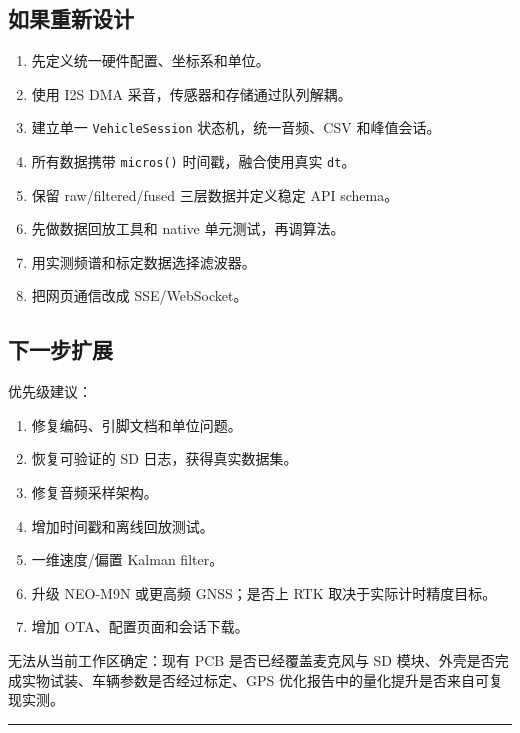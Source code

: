 \documentclass[
  UTF8,11pt,a4paper]{ctexart}
\newcommand{\passthrough}[1]{#1}
\providecommand{\tightlist}{%
  \setlength{\itemsep}{0pt}\setlength{\parskip}{0pt}}
\begin{document}
\subsection{如果重新设计}\label{ux5982ux679cux91cdux65b0ux8bbeux8ba1}

\begin{enumerate}
\def\labelenumi{\arabic{enumi}.}
\tightlist
\item
  先定义统一硬件配置、坐标系和单位。
\item
  使用 I2S DMA 采音，传感器和存储通过队列解耦。
\item
  建立单一 \passthrough{\lstinline!VehicleSession!}
  状态机，统一音频、CSV 和峰值会话。
\item
  所有数据携带 \passthrough{\lstinline!micros()!} 时间戳，融合使用真实
  \passthrough{\lstinline!dt!}。
\item
  保留 raw/filtered/fused 三层数据并定义稳定 API schema。
\item
  先做数据回放工具和 native 单元测试，再调算法。
\item
  用实测频谱和标定数据选择滤波器。
\item
  把网页通信改成 SSE/WebSocket。
\end{enumerate}

\subsection{下一步扩展}\label{ux4e0bux4e00ux6b65ux6269ux5c55}

优先级建议：

\begin{enumerate}
\def\labelenumi{\arabic{enumi}.}
\tightlist
\item
  修复编码、引脚文档和单位问题。
\item
  恢复可验证的 SD 日志，获得真实数据集。
\item
  修复音频采样架构。
\item
  增加时间戳和离线回放测试。
\item
  一维速度/偏置 Kalman filter。
\item
  升级 NEO-M9N 或更高频 GNSS；是否上 RTK 取决于实际计时精度目标。
\item
  增加 OTA、配置页面和会话下载。
\end{enumerate}

无法从当前工作区确定：现有 PCB 是否已经覆盖麦克风与 SD
模块、外壳是否完成实物试装、车辆参数是否经过标定、GPS
优化报告中的量化提升是否来自可复现实测。

\begin{center}\rule{0.5\linewidth}{0.5pt}\end{center}
\end{document}
